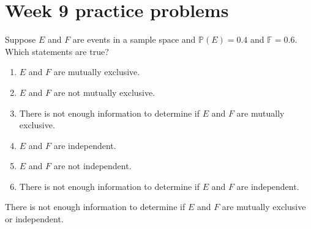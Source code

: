 \documentclass[../main.tex]{subfiles}
\begin{document}
\section{Week 9 practice problems}

\begin{exercise}
  Suppose \(E\) and \(F\) are events in a sample space and \(\mathbb{P}(E) = 0.4\) and \(\mathbb{F} = 0.6\). Which statements are true?

  \begin{enumerate}
    \item \(E\) and \(F\) are mutually exclusive.
    \item \(E\) and \(F\) are not mutually exclusive.
    \item There is not enough information to determine if \(E\) and \(F\) are mutually exclusive.
    \item \(E\) and \(F\) are independent.
    \item \(E\) and \(F\) are not independent.
    \item There is not enough information to determine if \(E\) and \(F\) are independent.
  \end{enumerate}

  \begin{solution}
    There is not enough information to determine if \(E\) and \(F\) are mutually exclusive or independent.
  \end{solution}
\end{exercise}
\end{document}
